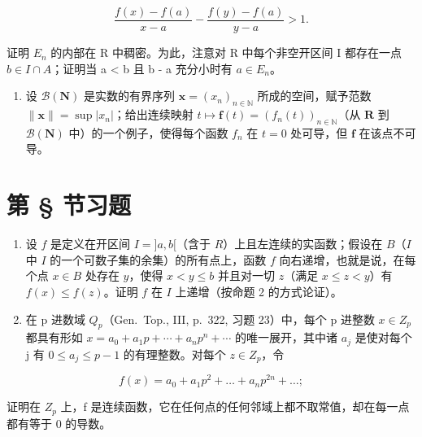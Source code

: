 \[
\frac {f (x) - f (a)}{x - a} - \frac {f (y) - f (a)}{y - a} > 1.
\]

证明 \(E_{n}\) 的内部在 R 中稠密。为此，注意对 R 中每个非空开区间 I 都存在一点 \(b \in I \cap A\)；证明当 a \textless{} b 且 b - a 充分小时有 \(a \in E_{n}\)。

\begin{enumerate}
\def\labelenumi{\arabic{enumi})}
\setcounter{enumi}{8}
\tightlist
\item
  设 \(\mathcal{B}(\mathbf{N})\) 是实数的有界序列 \(\mathbf{x} = (x_n)_{n\in \mathbb{N}}\) 所成的空间，赋予范数 \(\| \mathbf{x}\| = \sup |x_n|\)；给出连续映射 \(t\mapsto \mathbf{f}(t) = (f_n(t))_{n\in \mathbb{N}}\)（从 \(\mathbf{R}\) 到 \(\mathcal{B}(\mathbf{N})\) 中）的一个例子，使得每个函数 \(f_{n}\) 在 \(t = 0\) 处可导，但 \(\mathbf{f}\) 在该点不可导。
\end{enumerate}

\setcounter{exercisegroup}{1}
\section*{第 \S{} 节习题}
{}

\begin{enumerate}
\def\labelenumi{\arabic{enumi})}
\item
  设 \(f\) 是定义在开区间 \(I = ]a, b[\)（含于 \(R\)）上且左连续的实函数；假设在 \(B\)（\(I\) 中 \(I\) 的一个可数子集的余集）的所有点上，函数 \(f\) 向右递增，也就是说，在每个点 \(x \in B\) 处存在 \(y\)，使得 \(x < y \leqslant b\) 并且对一切 \(z\)（满足 \(x \leqslant z < y\)）有 \(f(x) \leqslant f(z)\)。证明 \(f\) 在 \(I\) 上递增（按命题 2 的方式论证）。
\item
  在 p 进数域 \(Q_{p}\)（Gen.~Top., III, p.~322, 习题 23）中，每个 p 进整数 \(x \in Z_{p}\) 都具有形如 \(x = a_{0} + a_{1}p + \cdots + a_{n}p^{n} + \cdots\) 的唯一展开，其中诸 \(a_{j}\) 是使对每个 j 有 \(0 \leqslant a_{j} \leqslant p - 1\) 的有理整数。对每个 \(z \in Z_{p}\)，令
\end{enumerate}

\[
f (x) = a _ {0} + a _ {1} p ^ {2} + \dots + a _ {n} p ^ {2 n} + \dots ;
\]

证明在 \(Z_{p}\) 上，f 是连续函数，它在任何点的任何邻域上都不取常值，却在每一点都有等于 0 的导数。

